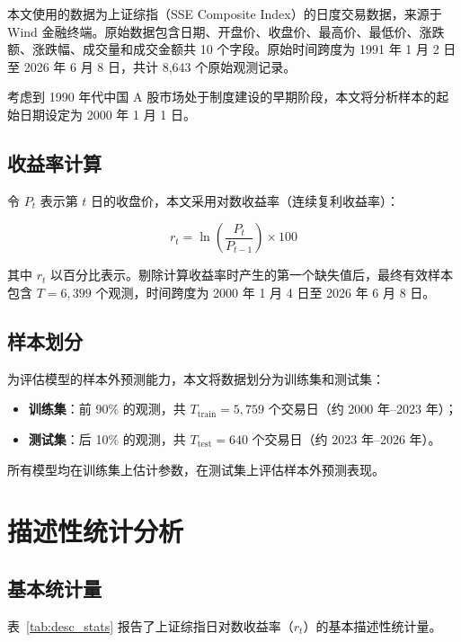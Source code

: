 \documentclass[12pt,a4paper]{article}
\begin{document}
本文使用的数据为上证综指（SSE Composite Index）的日度交易数据，来源于 Wind 金融终端。原始数据包含日期、开盘价、收盘价、最高价、最低价、涨跌额、涨跌幅、成交量和成交金额共 10 个字段。原始时间跨度为 1991 年 1 月 2 日至 2026 年 6 月 8 日，共计 8{,}643 个原始观测记录。

考虑到 1990 年代中国 A 股市场处于制度建设的早期阶段，本文将分析样本的起始日期设定为 2000 年 1 月 1 日。

\subsection{收益率计算}

令 $P_t$ 表示第 $t$ 日的收盘价，本文采用对数收益率（连续复利收益率）：

\begin{equation}\label{eq:return}
r_t = \ln\left(\frac{P_t}{P_{t-1}}\right) \times 100
\end{equation}

其中 $r_t$ 以百分比表示。剔除计算收益率时产生的第一个缺失值后，最终有效样本包含 $T = 6{,}399$ 个观测，时间跨度为 2000 年 1 月 4 日至 2026 年 6 月 8 日。

\subsection{样本划分}

为评估模型的样本外预测能力，本文将数据划分为训练集和测试集：

\begin{itemize}[nosep]
    \item \textbf{训练集}：前 90\% 的观测，共 $T_{\text{train}} = 5{,}759$ 个交易日（约 2000 年--2023 年）；
    \item \textbf{测试集}：后 10\% 的观测，共 $T_{\text{test}} = 640$ 个交易日（约 2023 年--2026 年）。
\end{itemize}

所有模型均在训练集上估计参数，在测试集上评估样本外预测表现。

\section{描述性统计分析}\label{sec:descriptive}

\subsection{基本统计量}

表~\ref{tab:desc_stats} 报告了上证综指日对数收益率（$r_t$）的基本描述性统计量。
\end{document}
